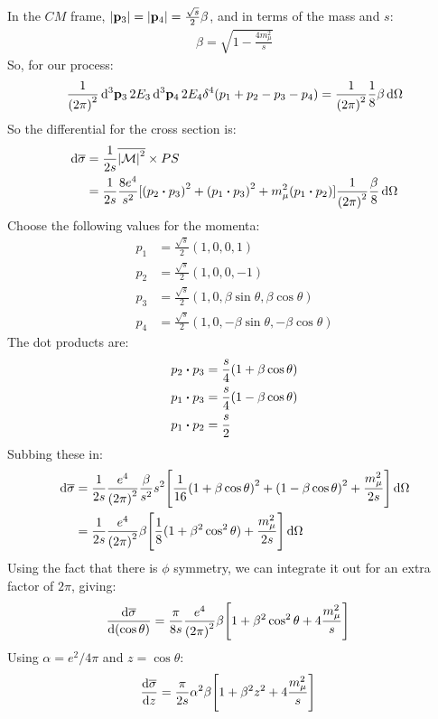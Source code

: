 In the $CM$ frame, $\abs{\vb{p}_3}=\abs{\vb{p}_4}=\frac{\sqrt{s}}2\beta$, and in terms of the mass and $s$:
\begin{align*}
  \beta=\sqrt{1-\frac{4m_\mu^2}{s}}
\end{align*}
So, for our process:
\begin{align*}
  \frac1{{(2\pi)}^2}\dd[3]{\vb{p}_3}{2E_3}\dd[3]{\vb{p}_4}{2E_4}
  \delta^4(p_1+p_2-p_3-p_4)=\frac1{{(2\pi)}^2}\frac18\beta\dd{\Omega}
\end{align*}
So the differential for the cross section is:
\begin{align*}
  \dd{\bar{\sigma}}&=\frac1{2s}\overline{\abs{\M}^2}\times PS\\
  &=\frac1{2s}\frac{8e^4}{s^2}
  [{(p_2\vdot p_3)}^2+{(p_1\vdot p_3)}^2+m_\mu^2(p_1\vdot p_2)]
  \frac1{{(2\pi)}^2}\frac{\beta}{8}\dd{\Omega}
\end{align*}
Choose the following values for the momenta:
\begin{align*}
  p_1&=\frac{\sqrt{s}}{2}(1,0,0,1)\\
  p_2&=\frac{\sqrt{s}}{2}(1,0,0,-1)\\
  p_3&=\frac{\sqrt{s}}{2}(1,0,\beta\sin\theta,\beta\cos\theta)\\
  p_4&=\frac{\sqrt{s}}{2}(1,0,-\beta\sin\theta,-\beta\cos\theta)
\end{align*}
The dot products are:
\begin{align*}
  p_2\vdot p_3&=\frac{s}{4}(1+\beta\cos\theta)\\
  p_1\vdot p_3&=\frac{s}{4}(1-\beta\cos\theta)\\
  p_1\vdot p_2&=\frac{s}{2}
\end{align*}
Subbing these in:
\begin{align*}
  \dd{\overline{\sigma}}&=\frac1{2s}\frac{e^4}{{(2\pi)}^2}\frac{\beta}{s^2}s^2
  \qty[\frac1{16}{(1+\beta\cos\theta)}^2+{(1-\beta\cos\theta)}^2+\frac{m_\mu^2}{2s}]
  \dd{\Omega}\\
  &=\frac1{2s}\frac{e^4}{{(2\pi)}^2}\beta
  \qty[\frac18(1+\beta^2\cos^2\theta)+\frac{m_\mu^2}{2s}]\dd{\Omega}
\end{align*}
Using the fact that there is $\phi$ symmetry, we can integrate it out for an extra factor of $2\pi$, giving:
\begin{align*}
  \dv{\overline{\sigma}}{(\cos\theta)}&=\frac\pi{8s}\frac{e^4}{{(2\pi)}^2}\beta
  \qty[1+\beta^2\cos^2\theta+4\frac{m_\mu^2}{s}]
\end{align*}
Using $\alpha=e^2/4\pi$ and $z=\cos\theta$:
\begin{align*}
  \dv{\overline{\sigma}}{z}&=\frac\pi{2s}\alpha^2\beta
  \qty[1+\beta^2z^2+4\frac{m_\mu^2}{s}]
\end{align*}
